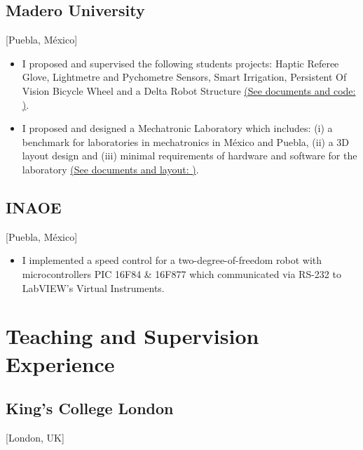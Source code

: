 \documentclass{mycv}
\begin{document}
\subsection{Madero University}[Puebla, M\'exico]
\begin{positions}
\end{positions}
\begin{itemize}
	\item I proposed and supervised the following students projects: Haptic Referee Glove,
	Lightmetre and Pychometre Sensors, Smart Irrigation, Persistent Of Vision Bicycle Wheel
	and a Delta Robot Structure 
	\href{https://sites.google.com/site/perezxochicaleprojects/studentprojects}{(See documents and code: \faExternalLink)}.
	\item I proposed and designed a Mechatronic Laboratory which includes: 
	(i) a benchmark for laboratories in mechatronics in M\'exico and Puebla, 
	(ii) a 3D layout design and 
	(iii) minimal requirements of hardware and software for the laboratory
	\href{https://sites.google.com/site/perezxochicaleprojects/mechatronicslaboratorydesign}{(See documents and layout: \faExternalLink)}.
\end{itemize}

\subsection{INAOE}[Puebla, M\'exico]
\begin{positions}
\end{positions}
\begin{itemize}
  \item  I implemented a speed control for a two-degree-of-freedom robot with microcontrollers
PIC 16F84 \& 16F877 which communicated via RS-232 to LabVIEW's Virtual Instruments.
\end{itemize}

\section{Teaching and Supervision \\ Experience}
\subsection{King's College London}[London, UK]

\begin{positions}
\end{positions}
\end{document}

